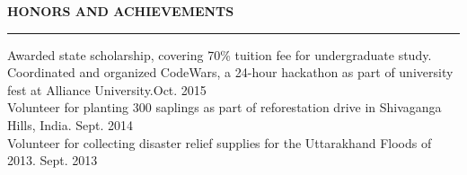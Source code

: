 \documentclass[a4paper]{article}
\newcommand{\myline}{\par
  \kern2pt %
  \hrule height 0.5pt
  \kern2pt %
}
\newcommand{\mybullet}{
	\indent \textbullet \hspace*{2mm}
}
\begin{document}
	\noindent
	{\large \textbf{HONORS AND ACHIEVEMENTS}}
	\myline 
	\smallskip

        \mybullet Awarded state scholarship, covering 70\% tuition fee for undergraduate study. \\
        \mybullet Coordinated and organized CodeWars, a 24-hour hackathon as part of 
        university fest at Alliance University.\hfill Oct. 2015\\
        \mybullet Volunteer for planting 300 saplings as part of reforestation drive in 
        Shivaganga Hills, India. \hfill Sept. 2014 \\
        \mybullet Volunteer for collecting disaster relief supplies for the Uttarakhand Floods 
        of 2013. \hfill Sept. 2013 \\
		
	
\end{document}
